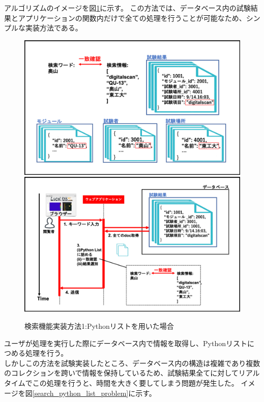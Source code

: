アルゴリズムのイメージを図\ref{search_python_list}に示す。
この方法では、データベース内の試験結果とアプリケーションの関数内だけで全ての処理を行うことが可能なため、シンプルな実装方法である。

\begin{figure}[bpt]
  \begin{center}
    \includegraphics[width=14cm]{search_python_list}
    \includegraphics[width=14cm]{search_python_list_flow}
  \caption[検索機能実装方法1:Pythonリストを用いた場合]{検索機能実装方法1:Pythonリストを用いた場合}
  \label{search_python_list}
  \end{center}
\end{figure}

ユーザが処理を実行した際にデータベース内で情報を取得し、Pythonリストにつめる処理を行う。
\\

しかしこの方法を試験実装したところ、データベース内の構造は複雑であり複数のコレクションを跨いで情報を保持しているため、試験結果全てに対してリアルタイムでこの処理を行うと、時間を大きく要してしまう問題が発生した。
イメージを図\ref{search_python_list_problem}に示す。

